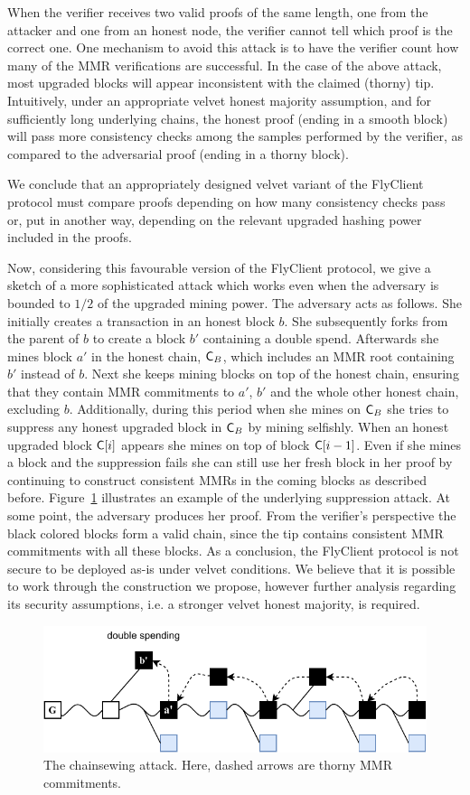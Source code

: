 	When the verifier receives two valid proofs of the same length, one from the attacker and one from an honest node,
	the verifier cannot tell which proof is the correct one. 
	One mechanism to avoid this attack is to have the verifier count how many of
	the MMR verifications are successful. In the case of the above attack, most upgraded blocks will appear inconsistent with the claimed (thorny) tip.
	Intuitively, under an appropriate velvet honest majority assumption, and for sufficiently long underlying chains, the honest proof (ending in a smooth block)
	will pass more consistency checks among the samples performed
	by the verifier, as compared to the adversarial proof (ending in a thorny block).

	We conclude that an appropriately designed velvet variant of the FlyClient protocol must compare proofs depending on how many
	consistency checks pass or, put in another way, depending on the relevant upgraded hashing power included in the proofs. 

	Now, considering this favourable version of the FlyClient protocol, we give a sketch of a more sophisticated attack which works
	even when the adversary is bounded to $1/2$ of the upgraded mining power.
	The adversary acts as follows.
		She initially creates a transaction in an honest block $b$. She subsequently forks from the parent of $b$ to create a block $b'$ containing
		a double spend.
    Afterwards she mines block $a'$ in the honest chain, $\mathsf{C}_B$, which includes an MMR root containing $b'$ instead of $b$.
    Next she keeps mining blocks on top of the honest chain, ensuring that they contain MMR commitments to
		$a'$, $b'$ and the whole other honest chain, excluding $b$.
    Additionally, during this period when she mines on $\mathsf{C}_B$ she tries to suppress any honest upgraded block in $\mathsf{C}_B$ by mining selfishly.
    When an honest upgraded block $\mathsf{C}[i]$ appears she mines on top of block $\mathsf{C}[i-1]$.
    Even if she mines a block and the suppression fails she can still use her fresh block in her proof by continuing to construct consistent MMRs
    in the coming blocks as described before.
		Figure~\ref{fig:combined_chainsewing_flyclient} illustrates an example of the underlying suppression attack.
    At some point, the adversary produces her proof.
    From the verifier's perspective the black colored blocks form a valid chain,
    since the tip contains consistent MMR commitments with all these blocks.
	As a conclusion, the FlyClient protocol is not secure to be deployed as-is under velvet conditions. We believe that it is possible to work through the construction we propose,
	however further analysis regarding its security assumptions, i.e. a stronger velvet honest majority, is required.

	\begin{figure}
		\begin{center}
			\includegraphics[width=0.95\columnwidth]{figures/flyclient_combined_attack.pdf}
		\end{center}
		\caption{The chainsewing attack. Here, dashed arrows are thorny MMR commitments.}
		\label{fig:combined_chainsewing_flyclient}
	\end{figure}
